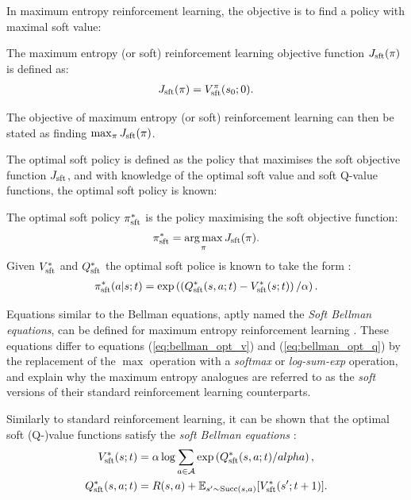         In maximum entropy reinforcement learning, the objective is to find a policy with maximal soft value:
        \begin{defn}
            \label{def:soft_rl_obj_fn}
            The \textnormal{maximum entropy (or soft) reinforcement learning objective function} $J_{{\textnormal{sft}}}(\pi)$ is defined as:
            \begin{align}
                J_{{\textnormal{sft}}}(\pi) = V_{{\textnormal{sft}}}^{\pi}(s_0;0). \label{eq:soft_rl_obj_fn_def}
            \end{align}

            The objective of maximum entropy (or soft) reinforcement learning can then be stated as finding $\max_{\pi} J_{{\textnormal{sft}}}(\pi)$.
        \end{defn}

        The optimal soft policy is defined as the policy that maximises the soft objective function $J_{{\textnormal{sft}}}$, and with knowledge of the optimal soft value and soft Q-value functions, the optimal soft policy is known:
        \begin{defn}
            \label{def:opt_sft_policy}
            The \textnormal{optimal soft policy} $\pi_{{\textnormal{sft}}}^*$ is the policy maximising the soft objective function:
            \begin{align}
                \pi_{{\textnormal{sft}}}^* = \operatorname*{arg\,max}_\pi J_{{\textnormal{sft}}}(\pi). \label{eq:opt_sft_policy_def}
            \end{align}
            Given $V_{{\textnormal{sft}}}^*$ and $Q_{{\textnormal{sft}}}^*$ the optimal soft police is known to take the form \cite{deep_energy_policies}:
            \begin{align}
                \pi_{{\textnormal{sft}}}^*(a|s;t) = \exp\left(\left(Q_{{\textnormal{sft}}}^*(s,a;t) - V_{{\textnormal{sft}}}^*(s;t)\right) / \alpha \right). \label{eq:opt_sft_policy_from_opt_value_fns}
            \end{align}
        \end{defn}

        Equations similar to the Bellman equations, aptly named the \textit{Soft Bellman equations}, can be defined for maximum entropy reinforcement learning \cite{deep_energy_policies}. These equations differ to equations (\ref{eq:bellman_opt_v}) and (\ref{eq:bellman_opt_q}) by the replacement of the $\max$ operation with a \textit{softmax} or \textit{log-sum-exp} operation, and explain why the maximum entropy analogues are referred to as the \textit{soft} versions of their standard reinforcement learning counterparts.

        Similarly to standard reinforcement learning, it can be shown that the optimal soft (Q-)value functions satisfy the \textit{soft Bellman equations} \cite{deep_energy_policies}:
        \begin{align}
            V_{{\textnormal{sft}}}^*(s;t) &= \alpha \log \sum_{a\in\mathcal{A}} \exp\left( Q_{{\textnormal{sft}}}^*(s,a;t) / alpha \right), \label{eq:sft_bellman_opt_v} \\
            Q_{{\textnormal{sft}}}^*(s,a;t) &= R(s,a) + \mathbb{E}_{s'\sim {\textnormal{Succ}(s,a)}} [V_{{\textnormal{sft}}}^*(s';t+1)]. \label{eq:sft_bellman_opt_q}
        \end{align} 

